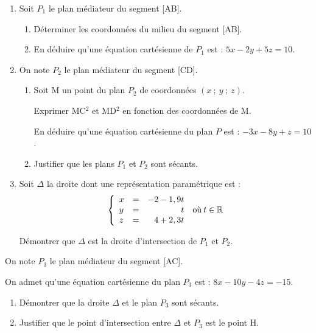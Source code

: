 \documentclass[10pt]{article}
\providecommand{\R}{\mathbb{R}}
\begin{document}
\begin{enumerate}[resume]
\item Soit $P_1$ le plan médiateur du segment [AB].
	\begin{enumerate}
		\item Déterminer les coordonnées du milieu du segment [AB].
		\item En déduire qu'une équation cartésienne de $P_1$ est : $5x - 2y + 5z = 10$.
	\end{enumerate}
\item On note $P_2$ le plan médiateur du segment [CD].
	\begin{enumerate}
		\item Soit M un point du plan $P_2$ de coordonnées $(x~;~y~;~z)$.
		
Exprimer MC$^2$ et MD$^2$ en fonction des coordonnées de M.

En déduire qu’une équation cartésienne du plan $P$ est : $-3x - 8y + z = 10$.
		\item Justifier que les plans $P_1$ et $P_2$ sont sécants.
	\end{enumerate}
\item Soit $\Delta$ la droite dont une représentation paramétrique est :
\[\left\{\begin{array}{l c l}
x& =& -2 - 1,9t\\
y&= &\phantom{-2 - 1,9}t\\
z&= & \phantom{-}4 + 2,3t
\end{array}\right.\: \text{où}\: t \in \R\]

Démontrer que $\Delta$ est la droite d’intersection de $P_1$ et $P_2$.
\end{enumerate}

On note $P_3$ le plan médiateur du segment [AC].

On admet qu'une équation cartésienne du plan $P_3$ est : $8x - 10y - 4z= - 15.$

\begin{enumerate}[resume]
\item Démontrer que la droite $\Delta$ et le plan $P_3$ sont sécants.
\item Justifier que le point d’intersection entre $\Delta$ et $P_3$ est le point H.
\end{enumerate}
\end{document}
